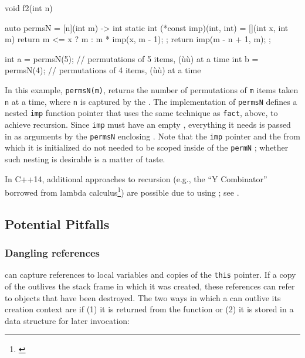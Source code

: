 \begin{emcppslisting}
void f2(int n)
{
    auto permsN = [n](int m) -> int
    {
        static int (*const imp)(int, int) = [](int x, int m) {
            return m <= x ? m : m * imp(x, m - 1);
        };
        return imp(m - n + 1, m);
    };

    int a = permsN(5);  // permutations of 5 items, (ù{}ù) at a time
    int b = permsN(4);  // permutations of 4 items, (ù{}ù) at a time
}
\end{emcppslisting}


\noindent In this example, \lstinline!permsN(m)!, returns the number of permutations
of \lstinline!m! items taken \lstinline!n! at a time, where \lstinline!n! is
captured by the . The implementation of
\lstinline!permsN! defines a nested \lstinline!imp! function pointer that uses
the same technique as \lstinline!fact!, above, to achieve recursion. Since
\lstinline!imp! must have an empty , everything it
needs is passed in as arguments by the \lstinline!permsN! enclosing
. Note that the \lstinline!imp! pointer and the
 from which it is initialized do not needed to
be scoped inside of the \lstinline!permN! ;
whether such nesting is desirable is a matter of taste.

In C++14, additional approaches to recursion (e.g., the ``Y Combinator''
borrowed from lambda calculus{\cprotect\footnote{\cite{derevenets16}}}) are possible due to
using ; see .

\subsection[Potential Pitfalls]{Potential Pitfalls}\label{potential-pitfalls-lambda}

\subsubsection[Dangling references]{Dangling references}\label{dangling-references}

 can capture references to local variables and
copies of the \lstinline!this! pointer. If a copy of the  outlives the stack frame in which it was created, these
references can refer to objects that have been destroyed. The two ways
in which a  can outlive its creation context are
if (1) it is returned from the function or (2) it is stored in a data
structure for later invocation:

